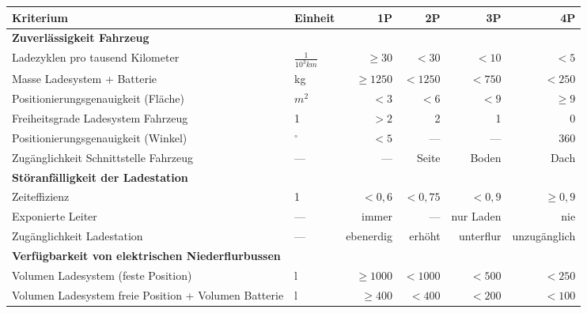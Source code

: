 \begin{table}
	\centering
	\begin{tabulary}{\linewidth}{LLrrrr}
		\toprule
		Kriterium                                                & Einheit              &         1P &      2P &        3P &           4P \\ \midrule
		\textbf{Zuverlässigkeit Fahrzeug}                        &                      &            &         &           &  \\
		Ladezyklen pro tausend Kilometer                         & $\frac{1}{10^{3}km}$ &   $\ge 30$ &   $<30$ &     $<10$ &         $<5$ \\
		Masse Ladesystem + Batterie                              & kg                   & $\ge 1250$ & $<1250$ &    $<750$ &       $<250$ \\
		Positionierungsgenauigkeit (Fläche)                      & $m^2$                &       $<3$ &    $<6$ &      $<9$ &      $\ge 9$ \\
		Freiheitsgrade Ladesystem Fahrzeug                       & 1                    &       $>2$ &       2 &         1 &            0 \\
		Positionierungsgenauigkeit (Winkel)                      & $^\circ$             &       $<5$ &     --- &       --- &        $360$ \\
		Zugänglichkeit Schnittstelle Fahrzeug                    & ---                  &        --- &   Seite &     Boden &         Dach \\ \midrule
		\textbf{Störanfälligkeit der Ladestation}                &                      &            &         &           &  \\
		Zeiteffizienz                                            & 1                    &     $<0,6$ & $<0,75$ &    $<0,9$ &    $\ge 0,9$ \\
		Exponierte Leiter                                        & ---                  &      immer &     --- & nur Laden &          nie \\
		Zugänglichkeit Ladestation                               & ---                  &  ebenerdig &  erhöht & unterflur & unzugänglich \\ \midrule
		\textbf{Verfügbarkeit von elektrischen Niederflurbussen} &                      &            &         &           &  \\
		Volumen Ladesystem (feste Position)                      & l                    & $\ge 1000$ & $<1000$ &    $<500$ &       $<250$ \\
		Volumen Ladesystem freie Position + Volumen Batterie     & l                    &  $\ge 400$ &  $<400$ &    $<200$ &       $<100$ \\ \midrule

\end{tabulary}
\end{table}
